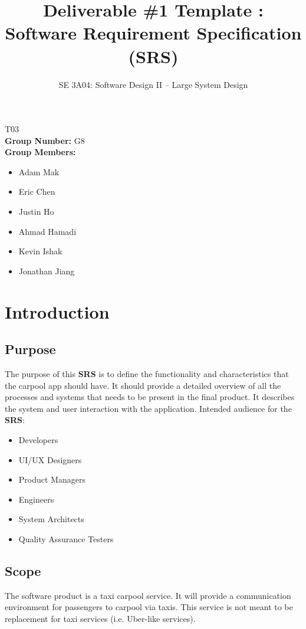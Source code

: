 \documentclass[]{article}
\title{Deliverable \#1 Template : Software Requirement Specification (\textbf{SRS})}
\author{SE 3A04: Software Design II -- Large System Design}
\date{}
\begin{document}
\maketitle\begin{center}
 T03\\
{\bf Group Number:} G8 \\
{\bf Group Members:} 
\begin{itemize} \centering
	\item Adam Mak
	\item Eric Chen
	\item Justin Ho
	\item Ahmad Hamadi
	\item Kevin Ishak
	\item Jonathan Jiang
\end{itemize}
\end{center}

\newpage
\section{Introduction}
\label{sec:introduction}

\subsection{Purpose}
\label{sub:purpose}
The purpose of this \textbf{SRS} is to define the functionality and characteristics that the carpool app should have. It should provide a detailed overview of all the processes and systems that needs to be present in the final product. It describes the system and user interaction with the application. Intended audience for the \textbf{SRS}:
\begin{itemize}
	\item Developers
	\item UI/UX Designers
	\item Product Managers
	\item Engineers
	\item System Architects
	\item Quality Assurance Testers
\end{itemize}

\subsection{Scope}
\label{sub:scope}
The software product is a taxi carpool service. It will provide a communication environment for passengers to carpool via taxis. This service is not meant to be replacement for taxi services (i.e. Uber-like services).
\end{document}
